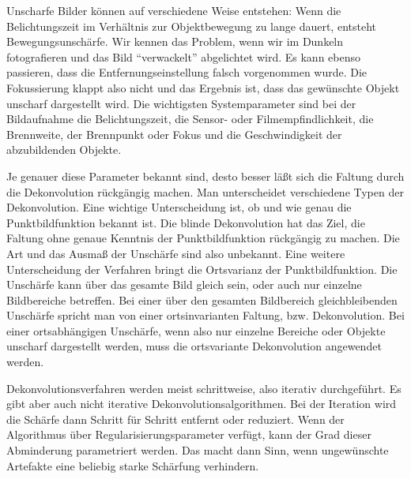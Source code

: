 \documentclass[a4paper,12pt]{article}
\begin{document}
Unscharfe Bilder können auf verschiedene Weise entstehen: Wenn die
Belichtungszeit im Verhältnis zur Objektbewegung zu lange dauert, entsteht 
Bewegungsunschärfe. Wir kennen das Problem, wenn wir im Dunkeln fotografieren
und das Bild "`verwackelt"' abgelichtet wird. Es kann ebenso passieren, dass die
Entfernungseinstellung falsch vorgenommen wurde. Die Fokussierung klappt also
nicht und das Ergebnis ist, dass das gewünschte Objekt unscharf dargestellt wird.
Die wichtigsten Systemparameter sind bei der Bildaufnahme die
Belichtungszeit, die Sensor- oder Filmempfindlichkeit, die Brennweite, der
Brennpunkt oder Fokus und die Geschwindigkeit der abzubildenden
Objekte.

Je genauer diese Parameter bekannt sind, desto besser läßt sich die Faltung
durch die Dekonvolution rückgängig machen. Man unterscheidet verschiedene Typen
der Dekonvolution. Eine wichtige Unterscheidung ist, ob und wie genau die
Punktbildfunktion bekannt ist. Die blinde Dekonvolution hat das Ziel, die
Faltung ohne genaue Kenntnis der Punktbildfunktion rückgängig zu machen. Die Art
und das Ausmaß der Unschärfe sind also unbekannt. Eine weitere Unterscheidung
der Verfahren bringt die Ortsvarianz der Punktbildfunktion. Die Unschärfe kann über
das gesamte Bild gleich sein, oder auch nur einzelne Bildbereiche betreffen. Bei
einer über den gesamten Bildbereich gleichbleibenden Unschärfe spricht man von
einer ortsinvarianten Faltung, bzw. Dekonvolution. Bei einer ortsabhängigen
Unschärfe, wenn also nur einzelne Bereiche oder Objekte unscharf dargestellt
werden, muss die ortsvariante Dekonvolution angewendet werden.

Dekonvolutionsverfahren werden meist schrittweise, also iterativ durchgeführt.
Es gibt aber auch nicht iterative Dekonvolutions\-algorithmen. Bei der Iteration
wird die Schärfe dann Schritt für Schritt entfernt oder reduziert. Wenn der
Algorithmus über Regularisierungsparameter verfügt, kann der Grad dieser
Abminderung parametriert werden. Das macht dann Sinn, wenn ungewünschte
Artefakte eine beliebig starke Schärfung verhindern. 



\end{document}
